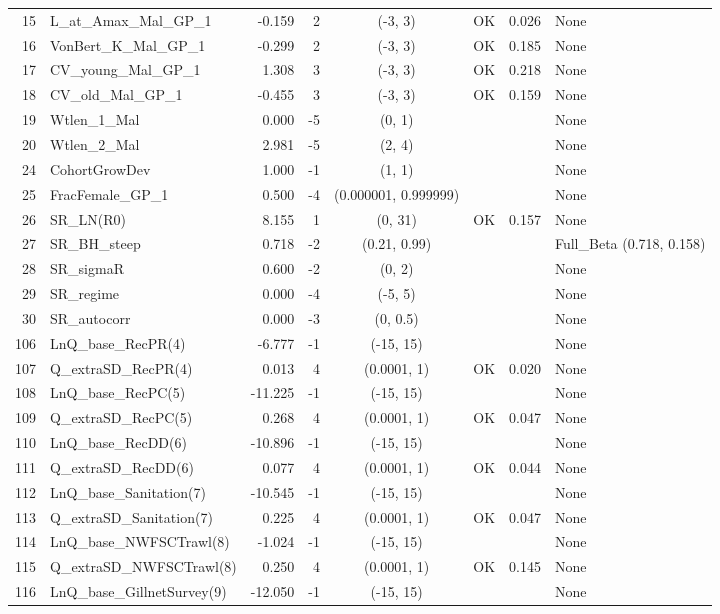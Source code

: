 \documentclass[12pt,]{article}
\begin{document}
\begin{landscape}
\begin{longtable}{rlrrcccl}
  15 & L\_at\_Amax\_Mal\_GP\_1 & -0.159 & 2 & (-3, 3) & OK & 0.026 & None \\ 
  16 & VonBert\_K\_Mal\_GP\_1 & -0.299 & 2 & (-3, 3) & OK & 0.185 & None \\ 
  17 & CV\_young\_Mal\_GP\_1 & 1.308 & 3 & (-3, 3) & OK & 0.218 & None \\ 
  18 & CV\_old\_Mal\_GP\_1 & -0.455 & 3 & (-3, 3) & OK & 0.159 & None \\ 
  19 & Wtlen\_1\_Mal & 0.000 & -5 & (0, 1) &  &  & None \\ 
  20 & Wtlen\_2\_Mal & 2.981 & -5 & (2, 4) &  &  & None \\ 
  24 & CohortGrowDev & 1.000 & -1 & (1, 1) &  &  & None \\ 
  25 & FracFemale\_GP\_1 & 0.500 & -4 & (0.000001, 0.999999) &  &  & None \\ 
  26 & SR\_LN(R0) & 8.155 & 1 & (0, 31) & OK & 0.157 & None \\ 
  27 & SR\_BH\_steep & 0.718 & -2 & (0.21, 0.99) &  &  & Full\_Beta (0.718, 0.158) \\ 
  28 & SR\_sigmaR & 0.600 & -2 & (0, 2) &  &  & None \\ 
  29 & SR\_regime & 0.000 & -4 & (-5, 5) &  &  & None \\ 
  30 & SR\_autocorr & 0.000 & -3 & (0, 0.5) &  &  & None \\ 
  106 & LnQ\_base\_RecPR(4) & -6.777 & -1 & (-15, 15) &  &  & None \\ 
  107 & Q\_extraSD\_RecPR(4) & 0.013 & 4 & (0.0001, 1) & OK & 0.020 & None \\ 
  108 & LnQ\_base\_RecPC(5) & -11.225 & -1 & (-15, 15) &  &  & None \\ 
  109 & Q\_extraSD\_RecPC(5) & 0.268 & 4 & (0.0001, 1) & OK & 0.047 & None \\ 
  110 & LnQ\_base\_RecDD(6) & -10.896 & -1 & (-15, 15) &  &  & None \\ 
  111 & Q\_extraSD\_RecDD(6) & 0.077 & 4 & (0.0001, 1) & OK & 0.044 & None \\ 
  112 & LnQ\_base\_Sanitation(7) & -10.545 & -1 & (-15, 15) &  &  & None \\ 
  113 & Q\_extraSD\_Sanitation(7) & 0.225 & 4 & (0.0001, 1) & OK & 0.047 & None \\ 
  114 & LnQ\_base\_NWFSCTrawl(8) & -1.024 & -1 & (-15, 15) &  &  & None \\ 
  115 & Q\_extraSD\_NWFSCTrawl(8) & 0.250 & 4 & (0.0001, 1) & OK & 0.145 & None \\ 
  116 & LnQ\_base\_GillnetSurvey(9) & -12.050 & -1 & (-15, 15) &  &  & None \\ 

\end{longtable}
\end{landscape}
\end{document}
